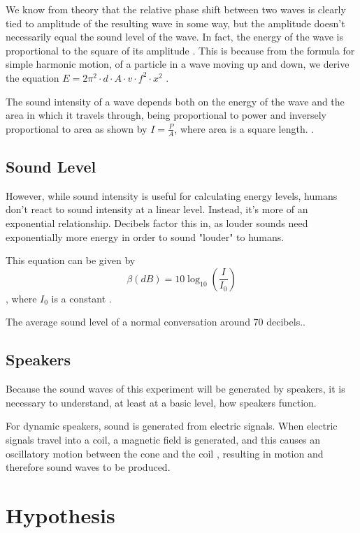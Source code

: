 \documentclass[index]{subfiles}
\begin{document}
We know from theory that the relative phase shift between two waves is clearly tied to amplitude of the resulting wave in some way, but the amplitude doesn't necessarily equal the sound level of the wave. In fact, the energy of the wave is proportional to the square of its amplitude \cite{openstax}. This is because from the formula for simple harmonic motion, of a particle in a wave moving up and down, we derive the equation \(E=2\pi^2\cdot d\cdot A\cdot v\cdot f^2\cdot x^2\) \cite{giancoli1995physics}.


The sound intensity of a wave depends both on the energy of the wave and the area in which it travels through, being proportional to power and inversely proportional to area as shown by \(I=\frac{P}{A}\), where area is a square length. \cite{openstax}.

\subsection{Sound Level}

However, while sound intensity is useful for calculating energy levels, humans don't react to sound intensity at a linear level. Instead, it's more of an exponential relationship. Decibels factor this in, as louder sounds need exponentially more energy in order to sound "louder" to humans.

This equation can be given by
$$
    \beta\left(dB\right)=10\log_{10}\left(\frac{I}{I_{0}}\right)
$$, where \(I_{0}\) is a constant \cite{openstax}.

The average sound level of a normal conversation around 70 decibels.\cite{speakers}.

\subsection{Speakers}

Because the sound waves of this experiment will be generated by speakers, it is necessary to understand, at least at a basic level, how speakers function. \cite{speakers}

For dynamic speakers, sound is generated from electric signals. When electric signals travel into a coil, a magnetic field is generated, and this causes an oscillatory motion between the cone and the coil \cite{openstax} \cite{speakers}, resulting in motion and therefore sound waves to be produced.

\section{Hypothesis}
\end{document}

